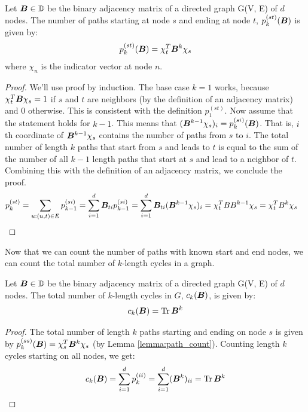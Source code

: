 \documentclass[11pt,a4paper]{article}
\begin{document}
\begin{lemma}
    Let ${\bm{B}} \in \mathbb{D}$ be the binary adjacency matrix of a directed graph G(V, E) of $d$ nodes. The number of paths starting at node $s$ and ending at node $t$, $p_{k}^{(st)}({\bm{B}})$ is given by:
    \begin{equation}
        p_k^{(st)}({\bm{B}}) = \chi_{t}^T {\bm{B}}^k \chi_{s} \label{eq:path_count}
    \end{equation}
    where $\chi_n$ is the indicator vector at node $n$. 
    \label{lemma:path_count}
\end{lemma}
\begin{proof}
    We'll use proof by induction. 
    The base case $k=1$ works, because $\chi_t^T {\bm{B}} \chi_s = 1$ if $s$ and $t$ are neighbors (by the definition of an adjacency matrix) and $0$ otherwise. This is consistent with the definition $p_1^{(st)}$. 
    Now assume that the statement holds for $k-1$. This means that $({\bm{B}}^{k-1} \chi_s)_i = p_{k}^{(si)}({\bm{B}})$. That is, $i$th coordinate of ${\bm{B}}^{k-1}\chi_s$ contains the number of paths from $s$ to $i$. The total number of length $k$ paths that start from $s$ and leads to $t$ is equal to the sum of the number of all $k-1$ length paths that start at $s$ and lead to a neighbor of $t$. Combining this with the definition of an adjacency matrix, we conclude the proof.
    \begin{align}
        p_{k}^{(st)} &= \sum_{u: (u, t) \in E} p_{k-1}^{(si)}
        = \sum_{i=1}^{d}{\bm{B}}_{ti} p_{k-1}^{(si)} 
        = \sum_{i=1}^{d} {\bm{B}}_{ti} ({\bm{B}}^{k-1}\chi_s)_i 
        = \chi_t^T B B^{k-1} \chi_s 
        = \chi_t^T B^k \chi_s
    \end{align}
\end{proof}
Now that we can count the number of paths with known start and end nodes, we can count the total number of $k$-length cycles in a graph. 
\begin{lemma}
    Let ${\bm{B}} \in \mathbb{D}$ be the binary adjacency matrix of a directed graph G(V, E) of $d$ nodes. The total number of $k$-length cycles in $G$, $c_k({\bm{B}})$, is given by:
    \begin{equation}
        c_k ({\bm{B}}) = \operatorname{Tr} {\bm{B}}^k
    \end{equation}
    \label{lemma:num_k_cycles}
\end{lemma}
\begin{proof}
    The total number of length $k$ paths starting and ending on node $s$ is given by $p_k^{(ss)} ({\bm{B}}) = \chi_s^T {\bm{B}}^k \chi_s$ (by Lemma \ref{lemma:path_count}). Counting length $k$ cycles starting on all nodes, we get:
    \begin{align}
        c_k({\bm{B}}) = \sum_{i=1}^{d} p_{k}^{(ii)} = \sum_{i=1}^{d} ({\bm{B}}^k)_{ii} = \operatorname{Tr} {\bm{B}}^k
    \end{align}
\end{proof}
\end{document}
